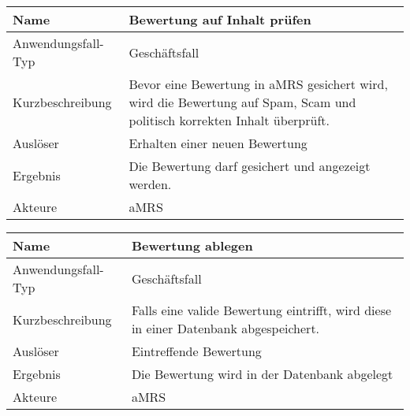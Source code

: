 \begin{table}[H]
    \centering
    \label{bewertungPruefen}
    \begin{tabularx}{\textwidth}{| l | X |}
        \hline
        Name               & Bewertung auf Inhalt prüfen                                                                                                   \\
        \hline
        Anwendungsfall-Typ & Geschäftsfall                                                                                                                 \\
        \hline
        Kurzbeschreibung   & Bevor eine Bewertung in \ac{aMRS} gesichert wird, wird die Bewertung auf Spam, Scam und politisch korrekten Inhalt überprüft. \\
        \hline
        Auslöser           & Erhalten einer neuen Bewertung                                                                                                \\
        \hline
        Ergebnis           & Die Bewertung darf gesichert und angezeigt werden.                                                                            \\
        \hline
        Akteure            & \ac{aMRS}                                                                                                                     \\
        \hline
    \end{tabularx}
\end{table}


\begin{table}[H]
    \centering
    \label{bewertungablegen}
    \begin{tabularx}{\textwidth}{| l | X |}
        \hline
        Name               & Bewertung ablegen                                                                   \\
        \hline
        Anwendungsfall-Typ & Geschäftsfall                                                                       \\
        \hline
        Kurzbeschreibung   & Falls eine valide Bewertung eintrifft, wird diese in einer Datenbank abgespeichert. \\
        \hline
        Auslöser           & Eintreffende Bewertung                                                              \\
        \hline
        Ergebnis           & Die Bewertung wird in der Datenbank abgelegt                                        \\
        \hline
        Akteure            & \ac{aMRS}                                                       \\
        \hline
    \end{tabularx}
\end{table}

